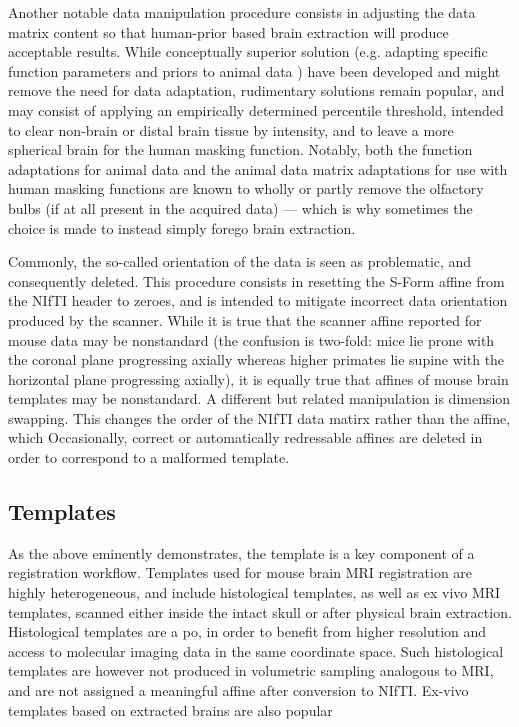 Another notable data manipulation procedure consists in adjusting the data matrix content so that human-prior based brain extraction will produce acceptable results.
While conceptually superior solution (e.g. adapting specific function parameters and priors to animal data \cite{rbet}) have been developed and might remove the need for data adaptation, rudimentary solutions remain popular, and may consist of applying an empirically determined percentile threshold, intended to clear non-brain or distal brain tissue by intensity, and to leave a more spherical brain for the human masking function.
Notably, both the function adaptations for animal data and the animal data matrix adaptations for use with human masking functions are known to wholly or partly remove the olfactory bulbs (if at all present in the acquired data) --- which is why sometimes the choice is made to instead simply forego brain extraction.

Commonly, the so-called orientation of the data is seen as problematic, and consequently deleted.
This procedure consists in resetting the S-Form affine from the NIfTI header to zeroes, and is intended to mitigate incorrect data orientation produced by the scanner.
While it is true that the scanner affine reported for mouse data may be nonstandard (the confusion is two-fold: mice lie prone with the coronal plane progressing axially whereas higher primates lie supine with the horizontal plane progressing axially), it is equally true that affines of mouse brain templates may be nonstandard.
A different but related manipulation is dimension swapping.
This changes the order of the NIfTI data matirx rather than the affine, which 
Occasionally, correct or automatically redressable affines are deleted in order to correspond to a malformed template.

\subsection{Templates}
As the above eminently demonstrates, the template is a key component of a registration workflow.
Templates used for mouse brain MRI registration are highly heterogeneous, and include histological templates, as well as ex vivo MRI templates, scanned either inside the intact skull or after physical brain extraction.
Histological templates are a po, in order to benefit from higher resolution and access to molecular imaging data in the same coordinate space.
Such histological templates are however not produced in volumetric sampling analogous to MRI, and are not assigned a meaningful affine after conversion to NIfTI.
Ex-vivo templates based on extracted brains are also popular

